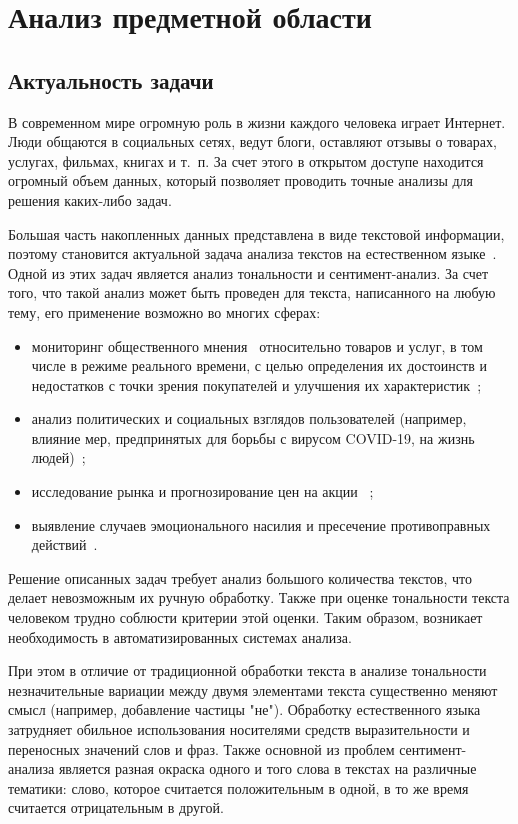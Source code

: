 \chapter{Анализ предметной области}

\section{Актуальность задачи}

В современном мире огромную роль в жизни каждого человека играет Интернет.
Люди общаются в социальных сетях, ведут блоги, оставляют отзывы о товарах,
услугах, фильмах, книгах и т.~п. За счет этого в открытом доступе находится
огромный объем данных, который позволяет проводить точные анализы для
решения каких-либо задач.  

Большая часть накопленных данных представлена в виде текстовой информации, поэтому
становится актуальной задача анализа текстов на естественном
языке~\cite{article8}. Одной из этих задач является анализ тональности и
сентимент-анализ. За счет того, что такой анализ может быть проведен для текста,
написанного на любую тему, его применение возможно во многих сферах:
\begin{itemize}
    \item мониторинг общественного мнения~\cite{article1} относительно товаров и
        услуг, в том числе в режиме реального времени, с целью определения их
        достоинств и недостатков с точки зрения покупателей и улучшения их
        характеристик~\cite{article3};
    \item анализ политических и социальных взглядов пользователей (например,
        влияние мер, предпринятых для борьбы с вирусом COVID-19, на жизнь
        людей)~\cite{article3};
    \item исследование рынка и прогнозирование цен на акции
       ~\cite{article3};
    \item выявление случаев эмоционального насилия и пресечение
        противоправных действий~\cite{article6}.
\end{itemize}

Решение описанных задач требует анализ большого количества текстов, что
делает невозможным их ручную обработку. Также при оценке тональности текста
человеком трудно соблюсти критерии этой оценки. Таким образом, возникает
необходимость в автоматизированных системах анализа.

При этом в отличие от традиционной обработки текста в анализе тональности
незначительные вариации между двумя элементами текста существенно меняют смысл
(например, добавление частицы "не"). Обработку естественного языка затрудняет
обильное использования носителями средств выразительности и переносных значений
слов и фраз. Также основной из проблем сентимент-анализа является разная окраска
одного и того слова в текстах на различные тематики: слово, которое считается
положительным в одной, в то же время считается отрицательным в другой.

